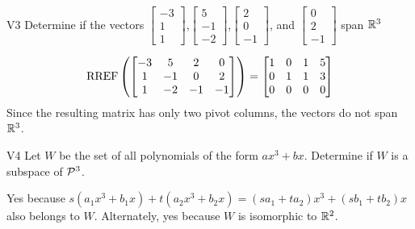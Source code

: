 \documentclass{sbgLAquiz}
\begin{document}
\begin{problem}{V3}
Determine if the vectors  $\begin{bmatrix} -3 \\ 1 \\ 1 \end{bmatrix}$,$\begin{bmatrix} 5 \\ -1 \\ -2 \end{bmatrix}$,$\begin{bmatrix}2 \\ 0 \\ -1 \end{bmatrix}$, and $\begin{bmatrix} 0 \\ 2 \\ -1\end{bmatrix}$ span $\IR^3$
\end{problem}
\begin{solution}
$$\RREF\left(\begin{bmatrix}
-3 & 5 & 2 & 0 \\ 1 & -1 & 0 & 2 \\ 1 & -2 & -1 & -1 \end{bmatrix}\right)=\begin{bmatrix} 1 & 0 & 1 & 5 \\ 0 & 1 & 1 & 3 \\ 0 & 0 & 0 & 0\end{bmatrix}$$
Since the resulting matrix has only two pivot columns, the vectors do not span $\IR^3$.
\end{solution}


\begin{extract}\newpage\end{extract}
\begin{problem}{V4} Let $W$ be the set of all polynomials of the form
\(ax^3+bx\).  Determine if $W$ is a subspace of \(\P^3\).
\end{problem}
\begin{solution}
Yes because \(s(a_1x^3+b_1x)+t(a_2x^3+b_2x)=
(sa_1+ta_2)x^3+(sb_1+tb_2)x\) also belongs to \(W\).
Alternately, yes because \(W\) is isomorphic to \(\IR^2\).
\end{solution}
\end{document}
